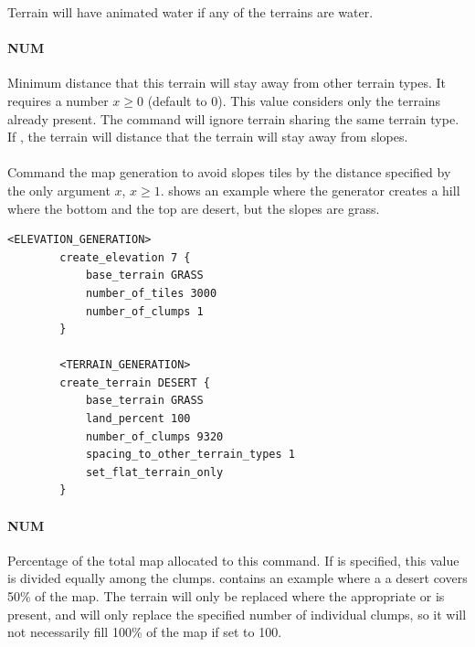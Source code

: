     \begin{note}
        Terrain will have animated water if any of the terrains are water.
    \end{note}

    \paragraph{ NUM}

    Minimum distance that this terrain will stay away from other terrain types. It requires a number $x \geq 0$ (default to 0). This value considers only the terrains already present. The command will ignore terrain sharing the same terrain type. If , the terrain will distance that the terrain will stay away from slopes.

    \paragraph{}

    Command the map generation to avoid slopes tiles by the distance specified by the only argument $x$, $x \geq 1$.  shows an example where the generator creates a hill where the bottom and the top are desert, but the slopes are grass.

    \begin{lstlisting}[language={rms},label={lst:flatterrainonly}]
        <ELEVATION_GENERATION>
        create_elevation 7 {
            base_terrain GRASS
            number_of_tiles 3000
            number_of_clumps 1
        }

        <TERRAIN_GENERATION>
        create_terrain DESERT {
            base_terrain GRASS
            land_percent 100
            number_of_clumps 9320
            spacing_to_other_terrain_types 1
            set_flat_terrain_only
        }
    \end{lstlisting}

    \paragraph{ NUM}

    Percentage of the total map allocated to this  command. If  is specified, this value is divided equally among the clumps.  contains an example where a a desert covers 50\% of the map. The terrain will only be replaced where the appropriate  or  is present, and will only replace the specified number of individual clumps, so it will not necessarily fill 100\% of the map if set to 100.

